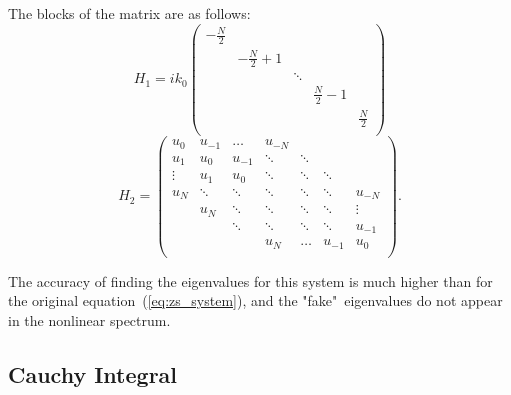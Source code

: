 The blocks of the matrix are as follows:
\begin{equation}
H_1 = i k_0 
    \begin{pmatrix}
    -\frac{N}{2} & & & & \\
                 & -\frac{N}{2} + 1 & & & \\
         &          & \ddots & & \\
         &          &   & \frac{N}{2} - 1 & \\
         &          &   &         & \frac{N}{2} \\
    \end{pmatrix}
\end{equation}
\begin{equation}
H_2 = 
    \begin{pmatrix}
    	u_0 & u_{-1} & \dots & u_{-N} & & & \\
    	u_{1} & u_{0} & u_{-1} & \ddots & \ddots & & \\
    	\vdots & u_{1} & u_{0} & \ddots & \ddots & \ddots & \\
        u_{N} & \ddots  & \ddots & \ddots & \ddots & \ddots & u_{-N} \\
        & u_{N} & \ddots  & \ddots & \ddots & \ddots & \vdots  \\
        &  & \ddots  & \ddots & \ddots & \ddots & u_{-1}  \\
        &  &   & u_{N} & \dots & u_{-1} & u_{0}  \\


    \end{pmatrix} {.}
\end{equation}

The accuracy of finding the eigenvalues for this system is much higher than for the original equation~(\ref{eq:zs_system}), and the "fake"\ eigenvalues do not appear in the nonlinear spectrum.


\subsection{Cauchy Integral}

